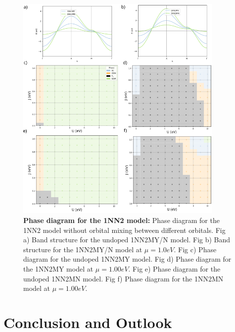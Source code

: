 \documentclass[12pt]{article}
\begin{document}
\begin{figure}[htbp]  %
    \centering
    \includegraphics[width=0.90\textwidth]{1NN2.png}  %
    \caption{\textbf{Phase diagram for the 1NN2 model:} Phase diagram for the 1NN2 model without orbital 
    mixing between different orbitals. Fig a) Band structure for the undoped 1NN2MY/N model. 
    Fig b) Band structure for the 1NN2MY/N model at $\mu =1.0eV$. 
    Fig c) Phase diagram for the undoped 1NN2MY model.
    Fig d) Phase diagram for the 1NN2MY model at $\mu =1.00eV$.
    Fig e) Phase diagram for the undoped 1NN2MN model.
    Fig f) Phase diagram for the 1NN2MN model at $\mu =1.00eV$.}
    \label{fig:1NN2pd}
\end{figure}
\newpage
\section{Conclusion and Outlook}
\end{document}
